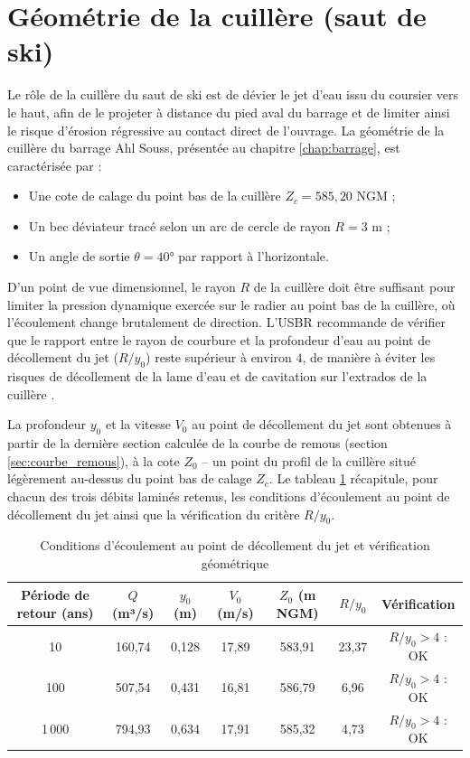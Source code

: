 \section{Géométrie de la cuillère (saut de ski)}
\label{sec:geometrie_cuillere}

Le rôle de la cuillère du saut de ski est de dévier le jet d'eau issu du coursier vers le haut, afin de le projeter à distance du pied aval du barrage et de limiter ainsi le risque d'érosion régressive au contact direct de l'ouvrage. La géométrie de la cuillère du barrage Ahl Souss, présentée au chapitre \ref{chap:barrage}, est caractérisée par :
\begin{itemize}
    \item Une cote de calage du point bas de la cuillère $Z_c = 585{,}20$ NGM ;
    \item Un bec déviateur tracé selon un arc de cercle de rayon $R = 3$ m ;
    \item Un angle de sortie $\theta = 40°$ par rapport à l'horizontale.
\end{itemize}

D'un point de vue dimensionnel, le rayon $R$ de la cuillère doit être suffisant pour limiter la pression dynamique exercée sur le radier au point bas de la cuillère, où l'écoulement change brutalement de direction. L'USBR recommande de vérifier que le rapport entre le rayon de courbure et la profondeur d'eau au point de décollement du jet ($R/y_0$) reste supérieur à environ $4$, de manière à éviter les risques de décollement de la lame d'eau et de cavitation sur l'extrados de la cuillère \cite{usbr1987design}.

La profondeur $y_0$ et la vitesse $V_0$ au point de décollement du jet sont obtenues à partir de la dernière section calculée de la courbe de remous (section \ref{sec:courbe_remous}), à la cote $Z_0$ -- un point du profil de la cuillère situé légèrement au-dessus du point bas de calage $Z_c$. Le tableau \ref{tab:geometrie_cuillere} récapitule, pour chacun des trois débits laminés retenus, les conditions d'écoulement au point de décollement du jet ainsi que la vérification du critère $R/y_0$.

\begin{table}[H]
    \centering
    \caption{Conditions d'écoulement au point de décollement du jet et vérification géométrique}
    \label{tab:geometrie_cuillere}
    \begin{tabular}{|c|c|c|c|c|c|c|}
        \hline
        \textbf{Période de retour (ans)} & \textbf{$Q$ (m³/s)} & \textbf{$y_0$ (m)} & \textbf{$V_0$ (m/s)} & \textbf{$Z_0$ (m NGM)} & \textbf{$R/y_0$} & \textbf{Vérification} \\
        \hline
        10 & 160,74 & 0,128 & 17,89 & 583,91 & 23,37 & $R/y_0 > 4$ : OK \\
        \hline
        100 & 507,54 & 0,431 & 16,81 & 586,79 & 6,96 & $R/y_0 > 4$ : OK \\
        \hline
        1\,000 & 794,93 & 0,634 & 17,91 & 585,32 & 4,73 & $R/y_0 > 4$ : OK \\
        \hline
    \end{tabular}
\end{table}

